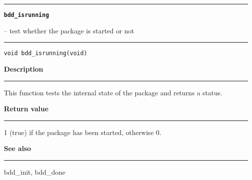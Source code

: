 \vspace{8ex}
\begin{minipage}{\textwidth}

\noindent\begin{minipage}{\textwidth}
\rule{\textwidth}{0.5mm}
{\tt\bf bdd\_isrunning }
\--- test whether the package is started or not  \hspace{\fill}
\\\rule[1.5ex]{\textwidth}{0.5mm}
\end{minipage}

\noindent\begin{verbatim}
void bdd_isrunning(void) 
\end{verbatim}

\vspace{\parsep}\noindent
{\bf Description}\\\rule[1.5ex]{\textwidth}{0.2mm}\vspace{-1.5ex}\setlength{\parindent}{1em}
This function tests the internal state of the package and returns
          a status. 

\setlength{\parindent}{0em}\vspace{\parsep}\vspace{\baselineskip}\noindent
{\bf Return value}\\\rule[1.5ex]{\textwidth}{0.2mm}\vspace{-1.5ex}
1 (true) if the package has been started, otherwise 0. 

\vspace{\parsep}\vspace{\baselineskip}\noindent
{\bf See also}\\\rule[1.5ex]{\textwidth}{0.2mm}\vspace{-1.5ex}
bdd\_init, bdd\_done 
\end{minipage}
\vspace{8ex}

